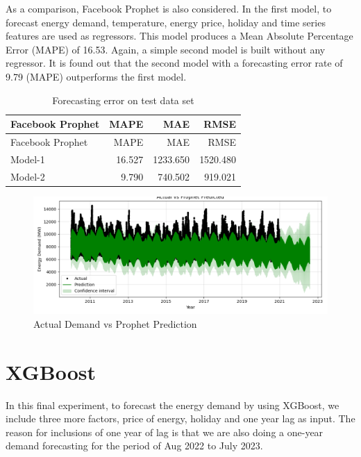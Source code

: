\documentclass[mstat,12pt]{unswthesis}
\begin{document}
As a comparison, Facebook Prophet is also considered. In the first
model, to forecast energy demand, temperature, energy price, holiday and
time series features are used as regressors. This model produces a Mean
Absolute Percentage Error (MAPE) of 16.53. Again, a simple second model
is built without any regressor. It is found out that the second model
with a forecasting error rate of 9.79 (MAPE) outperforms the first
model.

\begin{longtable}[]{@{}lrrr@{}}
\caption{Forecasting error on test data set}\tabularnewline
\toprule\noalign{}
Facebook Prophet & MAPE & MAE & RMSE \\
\midrule\noalign{}
\endfirsthead
\toprule\noalign{}
Facebook Prophet & MAPE & MAE & RMSE \\
\midrule\noalign{}
\endhead
\bottomrule\noalign{}
\endlastfoot
Model-1 & 16.527 & 1233.650 & 1520.480 \\
Model-2 & 9.790 & 740.502 & 919.021 \\
\end{longtable}

\begin{figure}[H]
\includegraphics[width=1\linewidth,]{images/Actual_Demand_vs_Prophet_Prediction} \caption{Actual Demand vs Prophet Prediction}\label{fig:actual-demand-vs-prophet-prediction}
\end{figure}

\hypertarget{xgboost}{%
\section{XGBoost}\label{xgboost}}

In this final experiment, to forecast the energy demand by using
XGBoost, we include three more factors, price of energy, holiday and one
year lag as input. The reason for inclusions of one year of lag is that
we are also doing a one-year demand forecasting for the period of Aug
2022 to July 2023.
\end{document}
